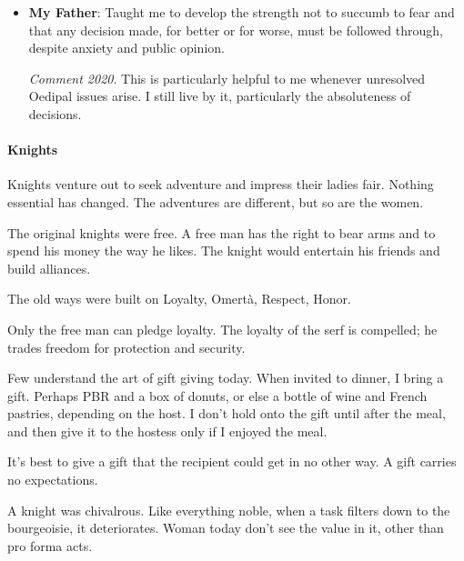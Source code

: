 \begin{itemize}
Whatever the historical context in which he is placed, \emph{homo religiosus} always believes that there is an absolute reality, the sacred, which transcends this world but manifests itself in this world, thereby sanctifying it and making it real.

Perceived by virtue of a religious experience, the specific mode of existence of the stone reveals to man the nature of an absolute existence, beyond time, invulnerable to be. coming.

\item \textbf{My Father}: Taught me to develop the strength not to succumb to fear and that any decision made, for better or for worse, must be followed through, despite anxiety and public opinion.

\emph{Comment 2020}. This is particularly helpful to me whenever unresolved Oedipal issues arise. I still live by it, particularly the absoluteness of decisions.
\end{itemize}

\paragraph{Knights}

Knights venture out to seek adventure and impress their ladies fair. Nothing essential has changed. The adventures are different, but so are the women.

The original knights were free. A free man has the right to bear arms and to spend his money the way he likes. The knight would entertain his friends and build alliances.

The old ways were built on Loyalty, Omertà, Respect, Honor.

Only the free man can pledge loyalty. The loyalty of the serf is compelled; he trades freedom for protection and security.

Few understand the art of gift giving today. When invited to dinner, I bring a gift. Perhaps PBR and a box of donuts, or else a bottle of wine and French pastries, depending on the host. I don't hold onto the gift until after the meal, and then give it to the hostess only if I enjoyed the meal.

It's best to give a gift that the recipient could get in no other way. A gift carries no expectations.

A knight was chivalrous. Like everything noble, when a task filters down to the bourgeoisie, it deteriorates. Woman today don't see the value in it, other than pro forma acts.

